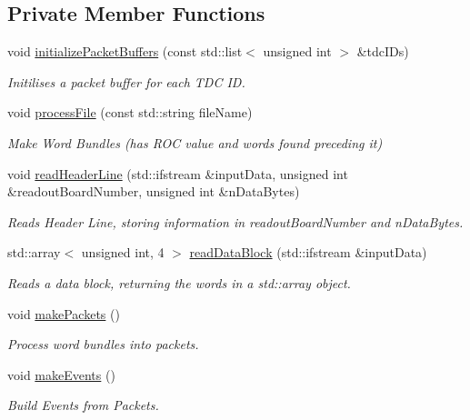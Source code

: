 \subsection*{Private Member Functions}
\begin{DoxyCompactItemize}
\item 
void \hyperlink{class_processor_aa9ad1e9d6f3d217e23649e42cd07de90}{initialize\+Packet\+Buffers} (const std\+::list$<$ unsigned int $>$ \&tdc\+I\+Ds)
\begin{DoxyCompactList}\small\item\em Initilises a packet buffer for each T\+DC ID. \end{DoxyCompactList}\item 
void \hyperlink{class_processor_a8dc09976d642ca778f5aa606b526a510}{process\+File} (const std\+::string file\+Name)
\begin{DoxyCompactList}\small\item\em Make Word Bundles (has R\+OC value and words found preceding it) \end{DoxyCompactList}\item 
void \hyperlink{class_processor_a31c772cd0725c185b53d271b6149c400}{read\+Header\+Line} (std\+::ifstream \&input\+Data, unsigned int \&readout\+Board\+Number, unsigned int \&n\+Data\+Bytes)
\begin{DoxyCompactList}\small\item\em Reads Header Line, storing information in readout\+Board\+Number and n\+Data\+Bytes. \end{DoxyCompactList}\item 
std\+::array$<$ unsigned int, 4 $>$ \hyperlink{class_processor_ad64350d14782bb238703023cb56613ef}{read\+Data\+Block} (std\+::ifstream \&input\+Data)
\begin{DoxyCompactList}\small\item\em Reads a data block, returning the words in a std\+::array object. \end{DoxyCompactList}\item 
void \hyperlink{class_processor_a395245680ed38f6c7bf568f5af262860}{make\+Packets} ()
\begin{DoxyCompactList}\small\item\em Process word bundles into packets. \end{DoxyCompactList}\item 
void \hyperlink{class_processor_ae06672fc3ac6ef73525b64d4f9f769e7}{make\+Events} ()
\begin{DoxyCompactList}\small\item\em Build Events from Packets. \end{DoxyCompactList}\end{DoxyCompactItemize}
